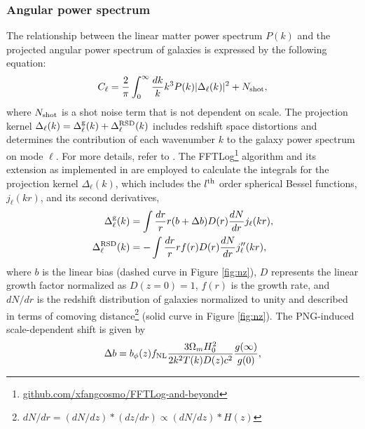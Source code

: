 \subsubsection{Angular power spectrum}
The relationship between the linear matter power spectrum $P(k)$ and the projected angular power spectrum of galaxies is expressed by the following equation:
\begin{equation}\label{eq:cell}
C_{\ell} = \frac{2}{\pi}\int_{0}^{\infty}\frac{dk}{k}k^{3}P(k)|\Delta_{\ell}(k)|^{2} + N_{\rm shot},
\end{equation}
where $N_{\rm shot}$ is a shot noise term that is not dependent on scale. The projection kernel $\Delta_{\ell}(k) = \Delta^{\rm g}_{\ell}(k) + \Delta^{\rm RSD}_{\ell}(k)$ includes redshift space distortions and determines the contribution of each wavenumber $k$ to the galaxy power spectrum on mode $\ell$. For more details, refer to \cite{Padmanabhan2007}. The FFTLog\footnote{\href{https://github.com/xfangcosmo/FFTLog-and-beyond}{github.com/xfangcosmo/FFTLog-and-beyond}} algorithm and its extension as implemented in \cite{fang2020beyond} are employed to calculate the integrals for the projection kernel $\Delta_{\ell}(k)$, which includes the $l^{\rm th}$ order spherical Bessel functions, $ j_{\ell}(kr)$, and its second derivatives,
\begin{align}
    \Delta^{\rm g}_{\ell}(k) &= \int \frac{dr}{r} r (b+\Delta b) D(r) \frac{dN}{dr} j_{\ell}(kr),\\
    \Delta^{\rm RSD}_{\ell}(k) &= - \int \frac{dr}{r} r f(r) D(r) \frac{dN}{dr} j^{\prime\prime}_{\ell}(kr),
\end{align}
where $b$ is the linear bias (dashed curve in Figure \ref{fig:nz}), $D$ represents the linear growth factor normalized as $D(z=0)=1$, $f(r)$ is the growth rate, and $dN/dr$ is the redshift distribution of galaxies normalized to unity and described in terms of comoving distance\footnote{$dN/dr = (dN/dz)*(dz/dr) \propto (dN/dz)*H(z)$} (solid curve in Figure \ref{fig:nz}). The PNG-induced scale-dependent shift is given by \citep{slosar2008constraints}
\begin{equation}
\Delta b = b_{\phi}(z) f_{\rm NL} \frac{3 \Omega_{m} H^{2}_{0}}{2 k^{2}T(k)D(z) c^{2}} \frac{g(\infty)}{g(0)},
\label{eq:scaledepbias}
\end{equation}
